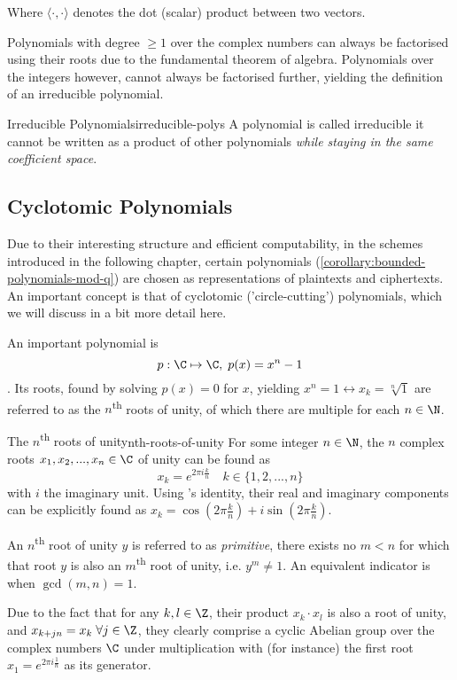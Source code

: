 Where $\langle \cdot, \cdot \rangle$ denotes the dot (scalar) product between two vectors.

Polynomials with degree $\geq 1$ over the complex numbers can always be factorised using their roots due to the fundamental theorem of algebra.
Polynomials over the integers however, cannot always be factorised further, yielding the definition of an irreducible polynomial.

\begin{definition}{Irreducible Polynomials}{irreducible-polys}
  A polynomial is called irreducible  it cannot be written as a product of other polynomials
  \textsl{while staying in the same coefficient space}.
\end{definition}

\subsection{Cyclotomic Polynomials}
Due to their interesting structure and efficient computability, in the schemes introduced in the following chapter, certain polynomials (\autoref{corollary:bounded-polynomials-mod-q}) are chosen as representations of plaintexts and ciphertexts.
An important concept is that of cyclotomic ('circle-cutting') polynomials, which we will discuss in a bit more detail here.

An important polynomial is $$p: \C \mapsto \C, \; p(x) = x^n - 1$$.
Its roots, found by solving $p(x) = 0$ for $x$, yielding $x^n = 1 \leftrightarrow x_k = \sqrt[n]{1}$ are referred to as the $n$\textsuperscript{th} roots of unity, of which there are multiple for each $n \in \N$.

\begin{lemma}{The $n$\textsuperscript{th} roots of unity}{nth-roots-of-unity}
  For some integer $n \in \N$, the $n$ complex roots $x_1, x_2, ..., x_n \in \C$ of unity
  can be found as $$x_k = e^{2\pi i \frac{k}{n}} \quad k \in \{1, 2, ..., n\}$$
  with $i$ the imaginary unit.
  Using 's identity, their real and imaginary components can be explicitly found as
  $x_k = \cos(2\pi \frac{k}{n}) + i \sin(2\pi \frac{k}{n})$.

  An $n$\textsuperscript{th} root of unity $y$ is referred to as \textit{primitive}, 
  there exists no $m < n$ for which that root $y$ is also an $m$\textsuperscript{th} root of unity, i.e. $y^m \neq 1$.
  An equivalent indicator is when $\gcd(m, n) = 1$.
\end{lemma}
Due to the fact that for any $k, l \in \Z$, their product $x_k \cdot x_l$ is also a root of unity, and
$x_{k+jn} = x_k \; \forall j \in \Z$, they clearly comprise a cyclic Abelian group over the complex numbers
$\C$ under multiplication with (for instance) the first root $x_1 = e^{2\pi i \frac{1}{n}}$ as its generator.

